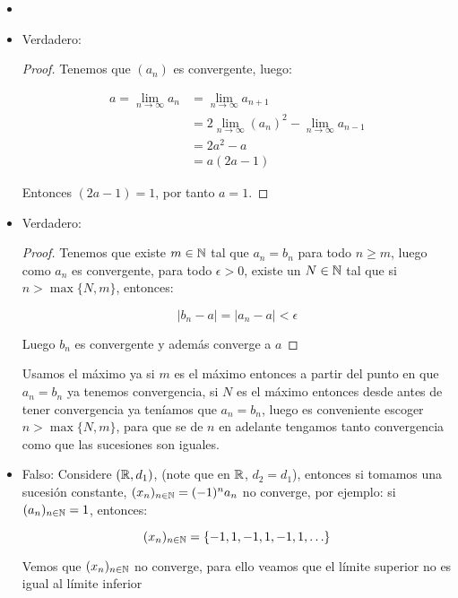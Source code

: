 \begin{itemize}[label={✎},leftmargin=*]
    \item 

    \item Verdadero:\\

    \begin{proof}
    Tenemos que $(a_n)$ es convergente, luego:

    \begin{align*}
        a=\lim_{n \to \infty} a_n&=\lim_{n \to \infty} a_{n+1}\\
        &=2\lim_{n \to \infty}(a_n)^2-\lim_{n \to \infty} a_{n-1}\\
        &=2a^2-a\\
        &=a(2a-1)
    \end{align*}
    
    Entonces $(2a-1)=1$, por tanto $a=1$.
    \end{proof}


    \item Verdadero:\\

    \begin{proof}
    Tenemos que existe $m\in \mathbb{N}$ tal que $a_n=b_n$ para todo $n\geq m$, luego como $a_n$ es convergente, para todo $\epsilon>0$, existe un $N\in \mathbb{N}$ tal que si $n>\max\{N,m\}$, entonces:

    $$|b_n-a|=|a_n-a|<\epsilon$$

    Luego $b_n$ es convergente y además converge a $a$
    \end{proof}

\begin{note}
Usamos el máximo ya si $m$ es el máximo entonces a partir del punto en que $a_n=b_n$ ya tenemos convergencia, si $N$ es el máximo entonces desde antes de tener convergencia ya teníamos que $a_n=b_n$, luego es conveniente escoger $n>\max\{N,m\}$, para que se de $n$ en adelante tengamos tanto convergencia como que las sucesiones son iguales.
\end{note}
    
    \item Falso: Considere $(\mathbb{R},d_1)$, (note que en $\mathbb{R}$, $d_2=d_1$), entonces si tomamos una sucesión constante, $(x_n)_{n\in\mathbb{N}}=(-1)^na_n$ no converge, por ejemplo: si $(a_n)_{n\in \mathbb{N}}=1$, entonces:

    $$(x_n)_{n\in \mathbb{N}}=\{-1,1,-1,1,-1,1,\ldots\}$$ 

    Vemos que $(x_n)_{n\in\mathbb{N}}$ no converge, para ello veamos que el límite superior no es igual al límite inferior\\


\end{itemize}

